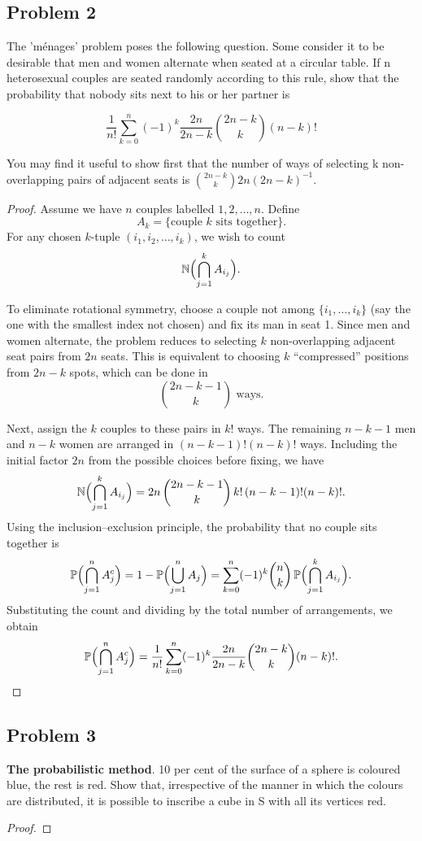 \documentclass[letterpaper, 11pt]{article}
\newcommand{\1}{\mathds{1}}	%
\theoremstyle{definition}
\begin{document}
\subsection*{Problem 2}
The 'ménages' problem poses the following question. Some consider it to be desirable that men and women alternate when seated at a circular table. If n heterosexual couples are seated randomly according to this rule, show that the probability that nobody sits next to his or her partner is

$$\frac{1}{n!}\sum_{k=0}^{n}(-1)^k\frac{2n}{2n-k}\binom{2n-k}{k}(n-k)!$$

You may find it useful to show first that the number of ways of selecting k non-overlapping pairs of adjacent seats is $\binom{2n-k}{k}2n(2n-k)^{-1}$.
\begin{proof}
    Assume we have \(n\) couples labelled \(1,2,\dots,n\). Define
\[
A_k = \{\text{couple } k \text{ sits together}\}.
\]
For any chosen \(k\)-tuple \((i_1,i_2,\dots,i_k)\), we wish to count 
\[
\mathbb{N}\Bigl(\bigcap_{j=1}^k A_{i_j}\Bigr).
\]

To eliminate rotational symmetry, choose a couple not among \(\{i_1,\dots,i_k\}\) (say the one with the smallest index not chosen) and fix its man in seat 1. Since men and women alternate, the problem reduces to selecting \(k\) non-overlapping adjacent seat pairs from \(2n\) seats. This is equivalent to choosing \(k\) “compressed” positions from \(2n-k\) spots, which can be done in
\[
\binom{2n-k-1}{k}\text{ ways}.
\]

Next, assign the \(k\) couples to these pairs in \(k!\) ways. The remaining \(n-k-1\) men and \(n-k\) women are arranged in \((n-k-1)! (n-k)!\) ways. Including the initial factor \(2n\) from the possible choices before fixing, we have
\[
\mathbb{N}\Bigl(\bigcap_{j=1}^k A_{i_j}\Bigr) = 2n\,\binom{2n-k-1}{k}\,k!\,(n-k-1)!(n-k)!.
\]
Using the inclusion--exclusion principle, the probability that no couple sits together is
\[
\mathbb{P}\Bigl(\bigcap_{j=1}^n A_j^c\Bigr) = 1-\mathbb{P}\Bigl(\bigcup_{j=1}^n A_j\Bigr)
=\sum_{k=0}^n (-1)^k \binom{n}{k}\,\mathbb{P}\Bigl(\bigcap_{j=1}^k A_{i_j}\Bigr).
\]
Substituting the count and dividing by the total number of arrangements, we obtain
\[
\mathbb{P}\Bigl(\bigcap_{j=1}^n A_j^c\Bigr) = \frac{1}{n!}\sum_{k=0}^n (-1)^k \frac{2n}{2n-k}\binom{2n-k}{k}(n-k)!.
\]
 \end{proof}
    \subsection*{Problem 3}
\textbf{The probabilistic method}. 10 per cent of the surface of a sphere is coloured blue, the rest is red.
Show that, irrespective of the manner in which the colours are distributed, it is possible to inscribe a cube in S with all its vertices red.
\begin{proof}
    
\end{proof}
\end{document}
